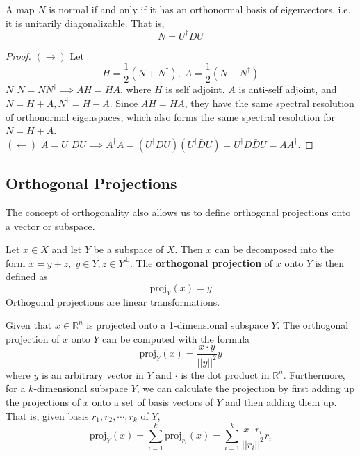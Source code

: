   \begin{theorem}
    A map $N$ is normal if and only if it has an orthonormal basis of eigenvectors, i.e. it is unitarily diagonalizable. That is, 
    \begin{equation}
      N = U^\dagger D U 
    \end{equation}
  \end{theorem}
  \begin{proof}
    $(\rightarrow)$ Let 
    \begin{equation}
      H = \frac{1}{2} (N + N^\dagger), \; A = \frac{1}{2} (N - N^\dagger)
    \end{equation}
    $N^\dagger N = N N^\dagger \implies A H = H A$, where $H$ is self adjoint, $A$ is anti-self adjoint, and $N = H + A, N^\dagger = H - A$. Since $A H = H A$, they have the same spectral resolution of orthonormal eigenspaces, which also forms the same spectral resolution for $N = H + A$. \\
    $(\leftarrow)$ $A = U^\dagger D U \implies A^\dagger A = (U^\dagger D U) (U^\dagger \bar{D} U) = U^\dagger D \bar{D} U = A A^\dagger$. 
  \end{proof}

\subsection{Orthogonal Projections}

  The concept of orthogonality also allows us to define orthogonal projections onto a vector or subspace. 

  \begin{definition}
    Let $x \in X$ and let $Y$ be a subspace of $X$. Then $x$ can be decomposed into the form $x = y + z, \; y \in Y, z \in Y^\perp$. The \textbf{orthogonal projection} of $x$ onto $Y$ is then defined as 
    \begin{equation}
      \text{proj}_Y (x) = y
    \end{equation}
    Orthogonal projections are linear transformations. 
  \end{definition}

  \begin{theorem}
    Given that $x \in \mathbb{R}^n$ is projected onto a 1-dimensional subspace $Y$. The orthogonal projection of $x$ onto $Y$ can be computed with the formula 
    \begin{equation}
      \text{proj}_Y (x) = \frac{x \cdot y}{||y||^2} y
    \end{equation}
    where $y$ is an arbitrary vector in $Y$ and $\cdot$ is the dot product in $\mathbb{R}^n$. Furthermore, for a $k$-dimensional subspace $Y$, we can calculate the projection by first adding up the projections of $x$ onto a set of basis vectors of $Y$ and then adding them up. That is, given basis $r_1, r_2, \cdots, r_k$ of $Y$,
    \begin{equation}
        \text{proj}_Y (x) = \sum_{i=1}^k \text{proj}_{r_i} (x) = \sum_{i=1}^k \frac{x \cdot r_i}{||r_i||^2} r_i 
    \end{equation}
  \end{theorem}

